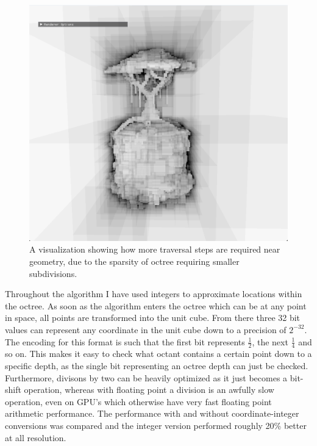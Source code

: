 \begin{figure}
	\centering
	\includegraphics[width=1\linewidth]{depth}
	\caption{A visualization showing how more traversal steps are required near geometry, due to the sparsity of octree requiring smaller subdivisions.}
	\label{fig:depth}
\end{figure}
Throughout the algorithm I have used integers to approximate locations within the octree. As soon as the algorithm enters the octree which can be at any point in space, all points are transformed into the unit cube. From there three 32 bit values can represent any coordinate in the unit cube down to a precision of $2^{-32}$. The encoding for this format is such that the first bit represents $\frac12$, the next $\frac14$ and so on. This makes it easy to check what octant contains a certain point down to a specific depth, as the single bit representing an octree depth can just be checked. Furthermore, divisons by two can be heavily optimized as it just becomes a bit-shift operation, whereas with floating point a division is an awfully slow operation, even on GPU's which otherwise have very fast floating point arithmetic performance. The performance with and without coordinate-integer conversions was compared and the integer version performed roughly 20\% better at all resolution.








